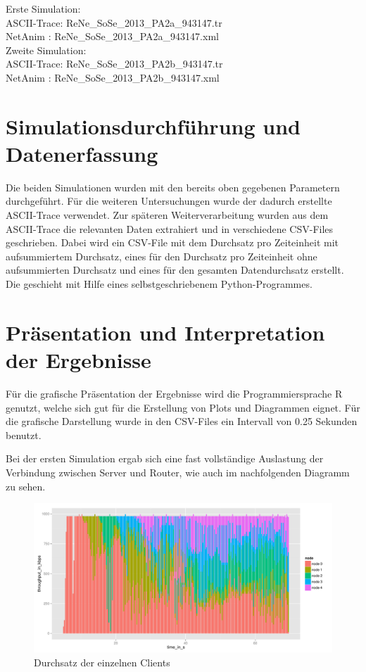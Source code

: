 \documentclass[a4paper, 12pt]{scrartcl}
\begin{document}
Erste Simulation: \\
ASCII-Trace: ReNe\_SoSe\_2013\_PA2a\_943147.tr \\
NetAnim : ReNe\_SoSe\_2013\_PA2a\_943147.xml  \\
Zweite Simulation: \\
ASCII-Trace: ReNe\_SoSe\_2013\_PA2b\_943147.tr \\
NetAnim : ReNe\_SoSe\_2013\_PA2b\_943147.xml  \\

\section{Simulationsdurchführung und Datenerfassung}
Die beiden Simulationen wurden mit den bereits oben gegebenen Parametern durchgeführt. Für die weiteren Untersuchungen wurde der dadurch erstellte ASCII-Trace verwendet.
Zur späteren Weiterverarbeitung wurden aus dem ASCII-Trace die relevanten Daten extrahiert und in verschiedene CSV-Files geschrieben. Dabei wird ein CSV-File mit dem Durchsatz pro Zeiteinheit mit aufsummiertem Durchsatz, eines für den Durchsatz pro Zeiteinheit ohne aufsummierten Durchsatz und eines für den gesamten Datendurchsatz erstellt. Die geschieht mit Hilfe eines selbstgeschriebenem Python-Programmes. 

\section{Präsentation und Interpretation der Ergebnisse}
Für die grafische Präsentation der Ergebnisse wird die Programmiersprache R genutzt, welche sich gut für die Erstellung von Plots und Diagrammen eignet. 
Für die grafische Darstellung wurde in den CSV-Files ein Intervall von 0.25 Sekunden benutzt.

Bei der ersten Simulation ergab sich eine fast vollständige Auslastung der Verbindung zwischen Server und Router, wie auch im nachfolgenden Diagramm zu sehen.

\begin{figure}[htbp]
	\centering
    \includegraphics[width=15cm]{ReNe_SoSe_2013_PA2a_943147_stackedbar.pdf}
  \caption{Durchsatz der einzelnen Clients}
  \label{Labelname}
\end{figure}
\end{document}
